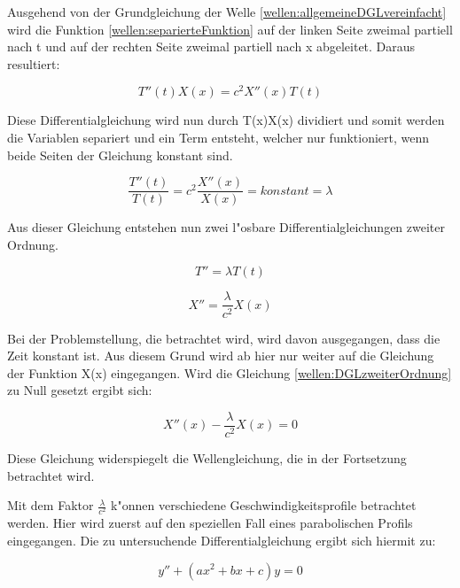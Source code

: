\begin{refsection}
Ausgehend von der Grundgleichung der Welle 
\ref{wellen:allgemeineDGLvereinfacht} wird die Funktion 
\ref{wellen:separierteFunktion} auf der linken Seite zweimal partiell nach t 
und auf der rechten Seite zweimal partiell nach x abgeleitet. Daraus resultiert:

\begin{equation}
	T''(t) X(x) = c^2 X''(x)T(t)
\end{equation}

Diese Differentialgleichung wird nun durch T(x)X(x) dividiert und somit werden 
die Variablen separiert und ein Term entsteht, welcher nur funktioniert, wenn 
beide Seiten der Gleichung konstant sind. 

\begin{equation}
	\frac{T''(t)}{T(t)}
	=
	c^2 \frac{X''(x)}{X(x)} = konstant = \lambda
\end{equation}

Aus dieser Gleichung entstehen nun zwei l"osbare Differentialgleichungen 
zweiter Ordnung.

\begin{equation}
	T''= \lambda T(t)
\end{equation}

\begin{equation}
	X''=\frac{\lambda}{c^2}X(x)
	\label{wellen:DGLzweiterOrdnung}
\end{equation}

Bei der Problemstellung, die betrachtet wird, wird davon ausgegangen, dass die 
Zeit konstant ist. Aus diesem Grund wird ab hier nur weiter auf die Gleichung 
der Funktion X(x) eingegangen. Wird die Gleichung 
\ref{wellen:DGLzweiterOrdnung} zu Null gesetzt ergibt sich:

\begin{equation}
	X''(x) -
	\frac{\lambda}{c^2} X(x)
	=0
\end{equation}

Diese Gleichung widerspiegelt die Wellengleichung, die in der Fortsetzung 
betrachtet wird. 

Mit dem Faktor $\frac{\lambda}{c^2}$ k"onnen verschiedene 
Geschwindigkeitsprofile betrachtet werden. Hier wird zuerst auf den speziellen 
Fall eines parabolischen Profils eingegangen. Die zu untersuchende 
Differentialgleichung ergibt sich hiermit zu:

\begin{equation}
y'' + (ax^2+bx+c)y
=
0
\label{wellen:grundgleichung}
\end{equation}






\end{refsection}
